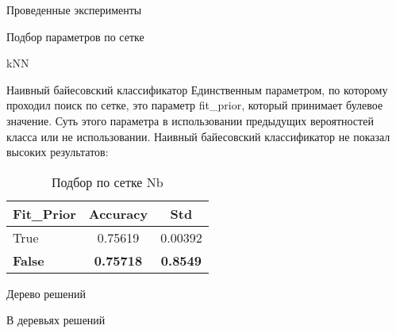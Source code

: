 \begin{section}{Проведенные эксперименты}
\begin{subsection}{Подбор параметров по сетке}
\begin{subsubsection}{kNN}
\begin{table}[H]
  \caption{Подбор по сетке kNN}
  \label{grid:knn}
  \end{table}



\end{subsubsection}


\begin{subsubsection}{Наивный байесовский классификатор}
Единственным параметром, по которому проходил поиск по сетке, это параметр fit\_prior, который принимает булевое значение. Суть этого параметра в использовании предыдущих вероятностей класса или не использовании.
Наивный байесовский классификатор не показал высоких результатов:

\begin{table}[H]
\centering
{\begin{tabular}{|l|c|c|}
\hline
\textbf{Fit\_Prior} & \textbf{Accuracy} & \textbf{Std} \\
\hline
True & 0.75619  & 0.00392 \\
\hline
\textbf{False} & \textbf{0.75718}  & \textbf{0.8549} \\
\hline
\end{tabular}}

\caption{Подбор по сетке Nb}
\label{grid:nb}
\end{table}



\end{subsubsection}


\begin{subsubsection}{Дерево решений}

В деревьях решений



\end{subsubsection}
\end{subsection}
\end{section}
